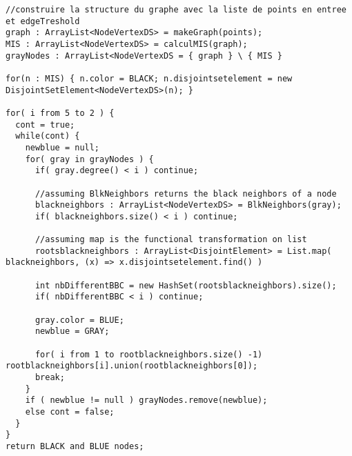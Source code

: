 \begin{lstlisting}
//construire la structure du graphe avec la liste de points en entree et edgeTreshold
graph : ArrayList<NodeVertexDS> = makeGraph(points);
MIS : ArrayList<NodeVertexDS> = calculMIS(graph);
grayNodes : ArrayList<NodeVertexDS = { graph } \ { MIS }

for(n : MIS) { n.color = BLACK; n.disjointsetelement = new DisjointSetElement<NodeVertexDS>(n); }

for( i from 5 to 2 ) {
  cont = true;
  while(cont) {
    newblue = null;
    for( gray in grayNodes ) {
      if( gray.degree() < i ) continue;
      
      //assuming BlkNeighbors returns the black neighbors of a node
      blackneighbors : ArrayList<NodeVertexDS> = BlkNeighbors(gray);
      if( blackneighbors.size() < i ) continue;
      
      //assuming map is the functional transformation on list
      rootsblackneighbors : ArrayList<DisjointElement> = List.map( blackneighbors, (x) => x.disjointsetelement.find() )
      
      int nbDifferentBBC = new HashSet(rootsblackneighbors).size();
      if( nbDifferentBBC < i ) continue;
      
      gray.color = BLUE;
      newblue = GRAY;
      
      for( i from 1 to rootblackneighbors.size() -1) rootblackneighbors[i].union(rootblackneighbors[0]);
      break;
    }
    if ( newblue != null ) grayNodes.remove(newblue);
    else cont = false;
  }
}
return BLACK and BLUE nodes;
\end{lstlisting}